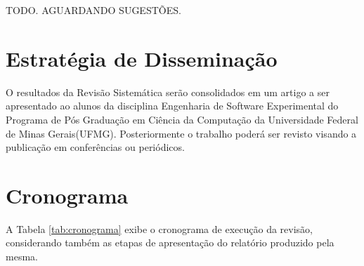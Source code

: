 \documentclass{article}
\begin{document}
TODO. AGUARDANDO SUGESTÕES.


\section{Estratégia de Disseminação}
\label{sec:dissiminacao}
O resultados da Revisão Sistemática serão consolidados em um artigo a ser
apresentado ao alunos da disciplina Engenharia de Software Experimental do
Programa de Pós Graduação em Ciência da Computação da Universidade Federal de
Minas Gerais(UFMG). Posteriormente o trabalho poderá ser revisto visando a
publicação em conferências ou periódicos.
\section{Cronograma}
\label{sec:cronograma}


A Tabela \ref{tab:cronograma} exibe o cronograma de execução da revisão, considerando
também as etapas de apresentação do relatório produzido pela mesma.
\end{document}
